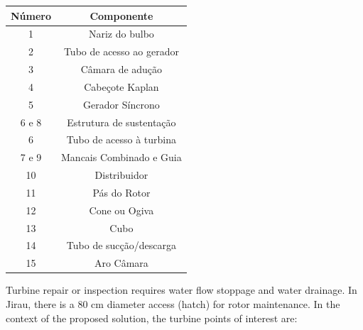 \begin{center}
\begin{tabular}{  c | c  }
  \hline
  \textbf{Número} & \textbf{Componente} \\ \hline
  1 & Nariz do bulbo \\ \hline
  2 & Tubo de acesso ao gerador  \\ \hline
  3 & Câmara de adução  \\ \hline
  4 & Cabeçote Kaplan  \\ \hline
  5 & Gerador Síncrono  \\ \hline
  6 e 8 & Estrutura de sustentação \\ \hline
  6 & Tubo de acesso à turbina \\ \hline
  7 e 9 & Mancais Combinado e Guia \\ \hline
  10 & Distribuidor \\ \hline
  11 & Pás do Rotor \\ \hline
  12 & Cone ou Ogiva \\ \hline
  13 & Cubo \\ \hline
  14 & Tubo de sucção/descarga \\ \hline
  15 & Aro Câmara \\
  \hline
\end{tabular}
\label{tab::bulb_turbine}
\end{center}

Turbine repair or inspection requires water flow stoppage and water drainage. In
Jirau, there is a 80 cm diameter access (hatch) for rotor maintenance. In the
context of the proposed solution, the turbine points of interest are:



